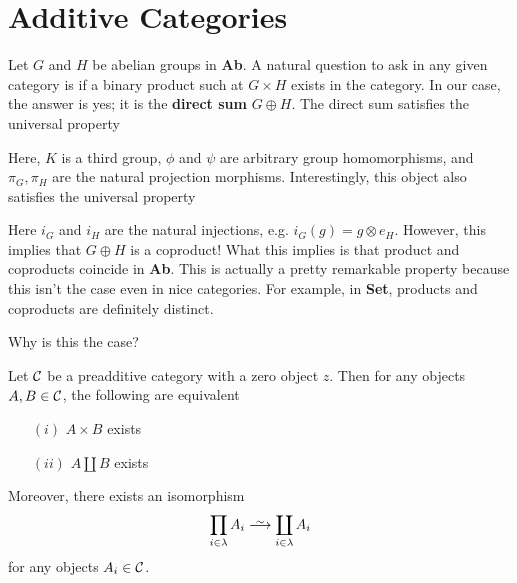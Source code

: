 \newpage
\section{Additive Categories}

Let $G$ and $H$ be abelian groups in \textbf{Ab}. A natural question to ask in any 
given category is if a binary product such at $G \times H$ exists in the category. In our case, 
the answer is yes; it is the \textbf{direct sum} $G \oplus H$. The direct sum satisfies the 
universal property 
\begin{center}
\end{center}
Here, $K$ is a third group, $\phi$ and $\psi$ are arbitrary group homomorphisms, and $\pi_G, \pi_H$ are the natural projection morphisms. 
Interestingly, this object also satisfies the universal property 
\begin{center}
\end{center}
Here $i_G$ and $i_H$ are the natural injections, e.g. $i_G(g) = g \otimes e_H$. 
However, this implies that $G \oplus H$ is a coproduct!
What this implies is 
that \textcolor{NavyBlue}{product and coproducts coincide in \textbf{Ab}}.
This is actually a pretty remarkable property because this isn't the case even 
in nice categories. For example, in \textbf{Set}, products and coproducts are 
definitely distinct.

\begin{center}
    Why is this the case? 
\end{center}

\begin{proposition}
    Let $\mathcal{C}$ be a preadditive category with a zero object $z$. 
    Then for any objects $A, B \in \mathcal{C}$, the following are equivalent
    \begin{itemize}
        \item[$(i)$] $A \times B$ exists 
        \item[$(ii)$] $A \amalg B$ exists 
    \end{itemize}
    Moreover, there exists an isomorphism 
        \[
            \prod_{i \in \lambda} A_i \isomarrow \coprod_{i \in \lambda}A_i
        \] 
        for any objects $A_i \in \mathcal{C}$. 
\end{proposition}

